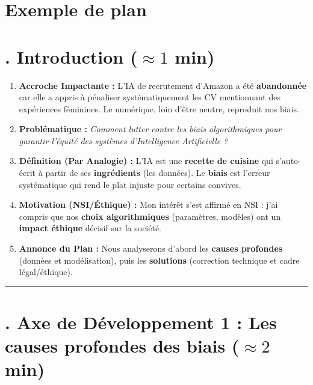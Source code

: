 \section{Exemple de plan}

\section*{. Introduction ($\approx 1$ min)}
\begin{enumerate}[label=\arabic*.]
    \item \textbf{Accroche Impactante :} L'IA de recrutement d'Amazon a été \textbf{abandonnée} car elle a appris à pénaliser systématiquement les CV mentionnant des expériences féminines. Le numérique, loin d'être neutre, reproduit nos biais.
    \item \textbf{Problématique :} \emph{Comment lutter contre les biais algorithmiques pour garantir l'équité des systèmes d'Intelligence Artificielle ?}
    \item \textbf{Définition (Par Analogie) :} L'IA est une \textbf{recette de cuisine} qui s'auto-écrit à partir de ses \textbf{ingrédients} (les données). Le \textbf{biais} est l'erreur systématique qui rend le plat injuste pour certains convives.
    \item \textbf{Motivation (NSI/Éthique) :} Mon intérêt s'est affirmé en NSI : j'ai compris que nos \textbf{choix algorithmiques} (paramètres, modèles) ont un \textbf{impact éthique} décisif sur la société.
    \item \textbf{Annonce du Plan :} Nous analyserons d'abord les \textbf{causes profondes} (données et modélisation), puis les \textbf{solutions} (correction technique et cadre légal/éthique).
\end{enumerate}

\hrule

\section*{. Axe de Développement 1 : Les causes profondes des biais ($\approx 2$ min)}
